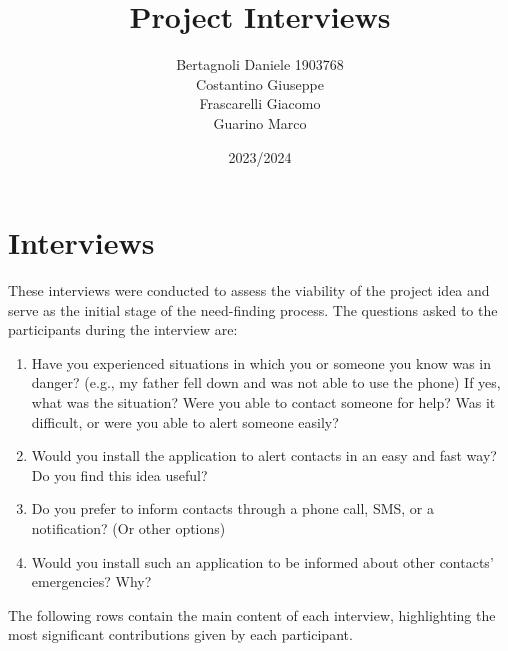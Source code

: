 \documentclass[12pt]{article}
\title{Project Interviews}
\author{Bertagnoli Daniele 1903768 \\ Costantino Giuseppe \\ Frascarelli Giacomo \\ Guarino Marco}
\date{2023/2024}
\begin{document}
\maketitle

\tableofcontents
\newpage

\section{Interviews}
These interviews were conducted to assess the viability of the project idea and serve as the initial stage of the need-finding process. The questions asked to the participants during the interview are:
\begin{enumerate}
    \item Have you experienced situations in which you or someone you know was in danger? (e.g., my father fell down and was not able to use the phone) If yes, what was the situation? Were you able to contact someone for help? Was it difficult, or were you able to alert someone easily?
    \item Would you install the application to alert contacts in an easy and fast way? Do you find this idea useful?
    \item Do you prefer to inform contacts through a phone call, SMS, or a notification? (Or other options)
    \item Would you install such an application to be informed about other contacts' emergencies? Why?
\end{enumerate}

The following rows contain the main content of each interview, highlighting the most significant contributions given by each participant.
\end{document}
